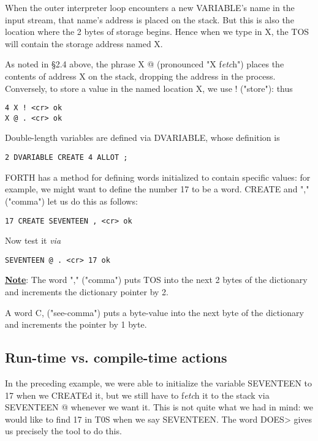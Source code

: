 When the outer interpreter loop encounters a new VARIABLE's name in the input stream, that name’s address is placed on the stack. But this is also the location where the 2 bytes of storage begins. Hence when we type in X, the TOS will contain the storage address named X.

As noted in §2.4 above, the phrase X @ (pronounced "X f\textit{etc}h") places the contents of address X on the stack, dropping the address in the process. Conversely, to store a value in the named location X, we use ! ("store"): thus
\begin{verbatim}
4 X ! <cr> ok
X @ . <cr> ok
\end{verbatim}

Double-length variables are defined via DVARIABLE, whose definition is

\begin{verbatim}
2 DVARIABLE CREATE 4 ALLOT ;
\end{verbatim}

FORTH has a method for defining words initialized to contain specific values: for example, we might want to define the number 17 to be a word. CREATE and "," ("comma") let us do this as follows:

\begin{verbatim}
17 CREATE SEVENTEEN , <cr> ok
\end{verbatim}

Now test it \textit{via}

\begin{verbatim}
SEVENTEEN @ . <cr> 17 ok
\end{verbatim}

\underline{\textbf{Note}}: The word "," ("comma") puts TOS into the next 2 bytes of the dictionary and increments the dictionary pointer by 2.

A word C, ("see-comma") puts a byte-value into the next byte of the dictionary and increments the pointer by 1 byte.

\subsection{Run-time vs. compile-time actions}

In the preceding example, we were able to initialize the variable SEVENTEEN to 17 when we CREATEd it, but we still have to f\textit{etc}h it to the stack via SEVENTEEN @ whenever we want it. This is not quite what we had in mind: we would like to find 17 in T0S when we say SEVENTEEN. The word DOES> gives us precisely the tool to do this.

